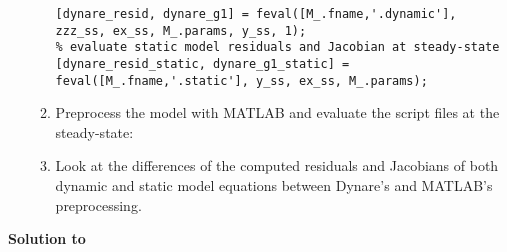 \begin{enumerate}
\begin{enumerate}
\begin{lstlisting}[style=Matlab-editor,basicstyle=\mlttfamily\scriptsize]
% evaluate dynamic model residuals and Jacobian at steady-state
[dynare_resid, dynare_g1] = feval([M_.fname,'.dynamic'], zzz_ss, ex_ss, M_.params, y_ss, 1);
% evaluate static model residuals and Jacobian at steady-state
[dynare_resid_static, dynare_g1_static] = feval([M_.fname,'.static'], y_ss, ex_ss, M_.params);
\end{lstlisting}
	\item Preprocess the model with MATLAB and evaluate the script files at the steady-state:
	\item Look at the differences of the computed residuals and Jacobians of both dynamic and static model equations
	  between Dynare's and MATLAB's preprocessing.
	\end{enumerate}
\end{enumerate}


\begin{solution}\textbf{Solution to }
\ifDisplaySolutions

\fi
\newpage
\end{solution}